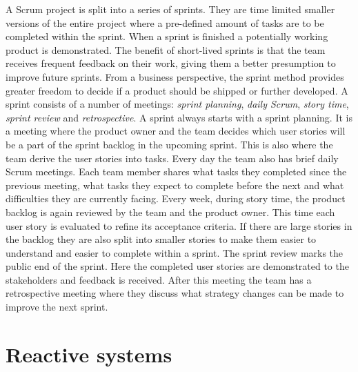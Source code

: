 A Scrum project is split into a series of sprints. They are time limited
smaller versions of the entire project where a pre-defined amount of tasks are
to be completed within the sprint. When a sprint is finished a potentially
working product is demonstrated. The benefit of short-lived sprints is that the
team receives frequent feedback on their work, giving them a better presumption
to improve future sprints. From a business perspective, the sprint method
provides greater freedom to decide if a product should be shipped or further
developed. A sprint consists of a number of meetings: \textit{sprint planning},
\textit{daily Scrum}, \textit{story time}, \textit{sprint review} and
\textit{retrospective}. A sprint always starts with a sprint planning. It is a
meeting where the product owner and the team decides which user stories will be
a part of the sprint backlog in the upcoming sprint. This is also where the
team derive the user stories into tasks. Every day the team also has brief
daily Scrum meetings. Each team member shares what tasks they completed since
the previous meeting, what tasks they expect to complete before the next and
what difficulties they are currently facing. Every week, during story time, the
product backlog is again reviewed by the team and the product owner. This time
each user story is evaluated to refine its acceptance criteria. If there are
large stories in the backlog they are also split into smaller stories to make
them easier to understand and easier to complete within a sprint. The sprint
review marks the public end of the sprint. Here the completed user stories are
demonstrated to the stakeholders and feedback is received. After this meeting
the team has a retrospective meeting where they discuss what strategy changes
can be made to improve the next sprint. \cite{sims2012scrum}

\section{Reactive systems}

